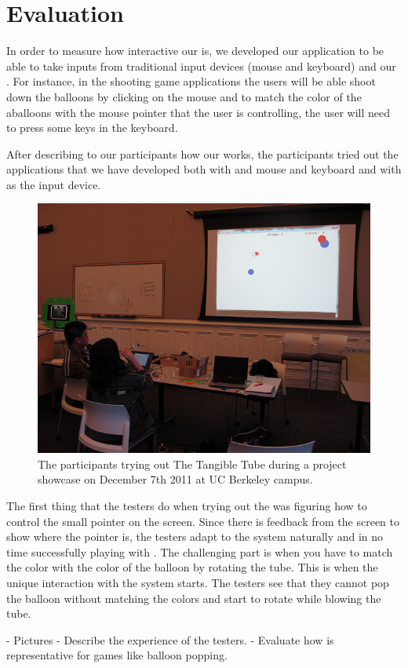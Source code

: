 \section{Evaluation}\label{sec:eval}
In order to measure how interactive our \tube is, we developed our application to be able to take inputs from traditional input devices (\ie mouse and keyboard) and our \tube. For instance, in the shooting game applications the users will be able shoot down the balloons by clicking on the mouse and to match the color of the aballoons with the mouse pointer that the user is controlling, the user will need to press some keys in the keyboard.

After describing to our participants how our \tube works, the participants tried out the applications that we have developed both with and mouse and keyboard and with \tube as the input device.

\begin{figure}
  \centering
  \includegraphics[width=\linewidth]{./figs/impl2.png}
  \caption{The participants trying out The Tangible Tube during a project showcase on December 7th 2011 at UC Berkeley campus.}
  \label{fig:impl2}
\end{figure}

The first thing that the testers do when trying out the \tube was figuring how to control the small pointer on the screen. Since there is feedback from the screen to show where the pointer is, the testers adapt to the system naturally and in no time successfully playing with \tube. The challenging part is when you have to match the color with the color of the balloon by rotating the tube. This is when the unique interaction with the system starts. The testers see that they cannot pop the balloon without matching the colors and start to rotate while blowing the tube.


\TODO
- Pictures \newline
- Describe the experience of the testers. \newline
- Evaluate how \tube is representative for games like balloon popping.
